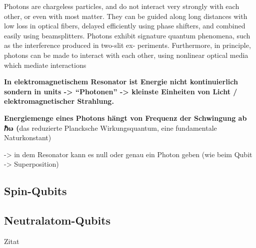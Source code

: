 Photons are chargeless particles, and do not interact very strongly with each other, or even with most matter. They can be guided along long distances with low loss in optical fibers, delayed efficiently using phase shifters, and combined easily using beamsplitters. Photons exhibit signature quantum phenomena, such as the interference produced in two-slit ex- periments. Furthermore, in principle, photons can be made to interact with each other, using nonlinear optical media which mediate interactions 

\textbf{In elektromagnetischem Resonator ist Energie nicht kontinuierlich sondern in units -> “Photonen” -> kleinste Einheiten von Licht / elektromagnetischer Strahlung. }

\textbf{Energiemenge eines Photons hängt von Frequenz der Schwingung ab ℏω (}das reduzierte Plancksche Wirkungsquantum, eine fundamentale Naturkonstant) 

-> in dem Resonator kann es null oder genau ein Photon geben (wie beim Qubit -> Superposition) 

 \cite{nielsen_quantum_2010}
 
\subsection{Spin-Qubits}
\subsection{Neutralatom-Qubits }



Zitat \cite{alhazmi_live_2024}

\cite{bergou_quantum_2021}

\printbibliography
